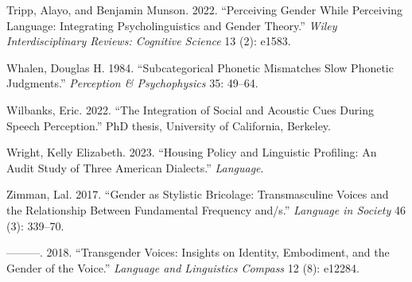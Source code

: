 \documentclass[
  letterpaper,
  DIV=11,
  numbers=noendperiod]{scrartcl}
\newlength{\cslhangindent}
\newenvironment{CSLReferences}[2] %
 {\begin{list}{}{%
  \setlength{\itemindent}{0pt}
  \setlength{\leftmargin}{0pt}
  \setlength{\parsep}{0pt}
  \ifodd #1
   \setlength{\leftmargin}{\cslhangindent}
   \setlength{\itemindent}{-1\cslhangindent}
  \fi
  \setlength{\itemsep}{#2\baselineskip}}}
 {\end{list}}
\begin{document}
\begin{CSLReferences}{1}{0}
Tripp, Alayo, and Benjamin Munson. 2022. {``Perceiving Gender While
Perceiving Language: Integrating Psycholinguistics and Gender Theory.''}
\emph{Wiley Interdisciplinary Reviews: Cognitive Science} 13 (2): e1583.

Whalen, Douglas H. 1984. {``Subcategorical Phonetic Mismatches Slow
Phonetic Judgments.''} \emph{Perception \& {Psychophysics}} 35: 49--64.

Wilbanks, Eric. 2022. {``The Integration of Social and Acoustic Cues
During Speech Perception.''} PhD thesis, University of California,
Berkeley.

Wright, Kelly Elizabeth. 2023. {``Housing Policy and Linguistic
Profiling: An Audit Study of Three American Dialects.''}
\emph{Language}.

Zimman, Lal. 2017. {``Gender as Stylistic Bricolage: Transmasculine
Voices and the Relationship Between Fundamental Frequency and/s.''}
\emph{Language in Society} 46 (3): 339--70.

---------. 2018. {``Transgender Voices: Insights on Identity,
Embodiment, and the Gender of the Voice.''} \emph{Language and
Linguistics Compass} 12 (8): e12284.

\end{CSLReferences}
\end{document}
